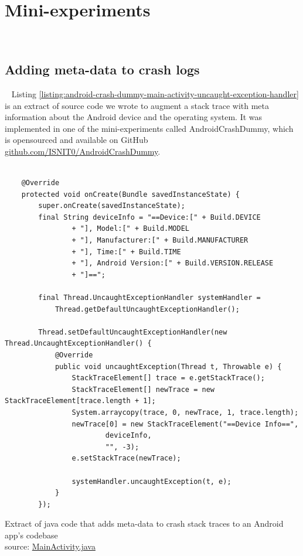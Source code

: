 \chapter{Mini-experiments}~\label{appendix-mini-experiments}

\section{Adding meta-data to crash logs}~\label{app-mini-experiment-meta-dat-to-crash-logs}
Listing \ref{listing:android-crash-dummy-main-activity-uncaught-exception-handler} is an extract of source code we wrote to augment a stack trace with meta information about the Android device and the operating system. It was implemented in one of the mini-experiments called AndroidCrashDummy, which is opensourced and available on GitHub \href{https://github.com/ISNIT0/AndroidCrashDummy}{github.com/ISNIT0/AndroidCrashDummy}.

\begin{listing}
\begin{verbatim}

    @Override
    protected void onCreate(Bundle savedInstanceState) {
        super.onCreate(savedInstanceState);
        final String deviceInfo = "==Device:[" + Build.DEVICE
                + "], Model:[" + Build.MODEL
                + "], Manufacturer:[" + Build.MANUFACTURER
                + "], Time:[" + Build.TIME
                + "], Android Version:[" + Build.VERSION.RELEASE
                + "]==";

        final Thread.UncaughtExceptionHandler systemHandler = 
            Thread.getDefaultUncaughtExceptionHandler();

        Thread.setDefaultUncaughtExceptionHandler(new Thread.UncaughtExceptionHandler() {
            @Override
            public void uncaughtException(Thread t, Throwable e) {
                StackTraceElement[] trace = e.getStackTrace();
                StackTraceElement[] newTrace = new StackTraceElement[trace.length + 1];
                System.arraycopy(trace, 0, newTrace, 1, trace.length);
                newTrace[0] = new StackTraceElement("==Device Info==",
                        deviceInfo,
                        "", -3);
                e.setStackTrace(newTrace);

                systemHandler.uncaughtException(t, e);
            }
        });
\end{verbatim}
\caption{Extract of java code that adds meta-data to crash stack traces to an Android app's codebase\\source: \href{https://github.com/ISNIT0/AndroidCrashDummy/blob/master/app/src/main/java/com/example/user/androidtestapp/MainActivity.java}{MainActivity.java}}
\label{listing:android-crash-dummy-main-activity-uncaught-exception-handler}
\end{listing}

